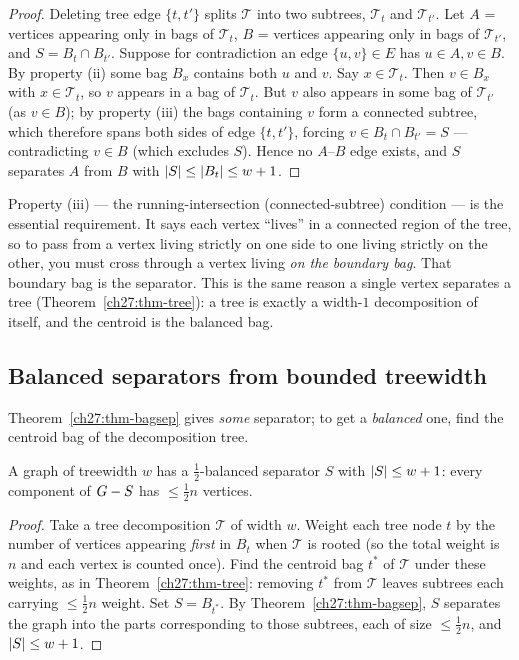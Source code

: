 \begin{proof}
Deleting tree edge $\{t,t'\}$ splits $\mathcal T$ into two subtrees, $\mathcal T_t$ and $\mathcal T_{t'}$. Let $A$ = vertices appearing only in bags of $\mathcal T_t$, $B$ = vertices appearing only in bags of $\mathcal T_{t'}$, and $S=B_t\cap B_{t'}$. Suppose for contradiction an edge $\{u,v\}\in E$ has $u\in A,v\in B$. By property (ii) some bag $B_x$ contains both $u$ and $v$. Say $x\in\mathcal T_t$. Then $v\in B_x$ with $x\in\mathcal T_t$, so $v$ appears in a bag of $\mathcal T_t$. But $v$ also appears in some bag of $\mathcal T_{t'}$ (as $v\in B$); by property (iii) the bags containing $v$ form a connected subtree, which therefore spans both sides of edge $\{t,t'\}$, forcing $v\in B_t\cap B_{t'}=S$ --- contradicting $v\in B$ (which excludes $S$). Hence no $A$--$B$ edge exists, and $S$ separates $A$ from $B$ with $\lvert S\rvert\le\lvert B_t\rvert\le w+1$.
\end{proof}

\begin{whybox}
Property (iii) --- the running-intersection (connected-subtree) condition --- is the essential requirement. It says each vertex ``lives'' in a connected region of the tree, so to pass from a vertex living strictly on one side to one living strictly on the other, you must cross through a vertex living \emph{on the boundary bag}. That boundary bag is the separator. This is the same reason a single vertex separates a tree (Theorem~\ref{ch27:thm-tree}): a tree is exactly a width-$1$ decomposition of itself, and the centroid is the balanced bag.
\end{whybox}

\subsection{Balanced separators from bounded treewidth}

Theorem~\ref{ch27:thm-bagsep} gives \emph{some} separator; to get a \emph{balanced} one, find the centroid bag of the decomposition tree.

\begin{theorem}\label{ch27:thm-tw-balanced}
A graph of treewidth $w$ has a $\tfrac12$-balanced separator $S$ with $\lvert S\rvert\le w+1$: every component of $G-S$ has $\le\tfrac12 n$ vertices.
\end{theorem}

\begin{proof}
Take a tree decomposition $\mathcal T$ of width $w$. Weight each tree node $t$ by the number of vertices appearing \emph{first} in $B_t$ when $\mathcal T$ is rooted (so the total weight is $n$ and each vertex is counted once). Find the centroid bag $t^*$ of $\mathcal T$ under these weights, as in Theorem~\ref{ch27:thm-tree}: removing $t^*$ from $\mathcal T$ leaves subtrees each carrying $\le\tfrac12 n$ weight. Set $S=B_{t^*}$. By Theorem~\ref{ch27:thm-bagsep}, $S$ separates the graph into the parts corresponding to those subtrees, each of size $\le\tfrac12 n$, and $\lvert S\rvert\le w+1$.
\end{proof}

